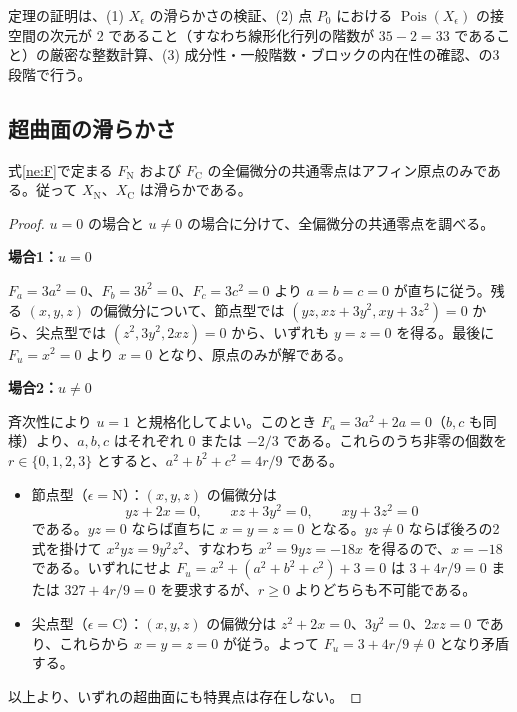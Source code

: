 定理の証明は、(1) $X_\epsilon$ の滑らかさの検証、(2) 点 $P_0$ における $\operatorname{Pois}(X_\epsilon)$ の接空間の次元が $2$ であること（すなわち線形化行列の階数が $35-2=33$ であること）の厳密な整数計算、(3) 成分性・一般階数・ブロックの内在性の確認、の3段階で行う。

\subsection{超曲面の滑らかさ}
\begin{lemma}\label{ne:smooth}
式\eqref{ne:F}で定まる $F_{\mathrm N}$ および $F_{\mathrm C}$ の全偏微分の共通零点はアフィン原点のみである。従って $X_{\mathrm N}$、$X_{\mathrm C}$ は滑らかである。
\end{lemma}
\begin{proof}
$u=0$ の場合と $u\ne0$ の場合に分けて、全偏微分の共通零点を調べる。

\par\medskip\noindent\textbf{場合1：$u=0$}\par\nobreak\smallskip
$F_a=3a^2=0$、$F_b=3b^2=0$、$F_c=3c^2=0$ より $a=b=c=0$ が直ちに従う。残る $(x,y,z)$ の偏微分について、節点型では $(yz,xz+3y^2,xy+3z^2)=0$ から、尖点型では $(z^2,3y^2,2xz)=0$ から、いずれも $y=z=0$ を得る。最後に $F_u=x^2=0$ より $x=0$ となり、原点のみが解である。

\par\medskip\noindent\textbf{場合2：$u\ne0$}\par\nobreak\smallskip
斉次性により $u=1$ と規格化してよい。このとき $F_a=3a^2+2a=0$（$b,c$ も同様）より、$a,b,c$ はそれぞれ $0$ または $-2/3$ である。これらのうち非零の個数を $r\in\{0,1,2,3\}$ とすると、$a^2+b^2+c^2=4r/9$ である。
\begin{itemize}
  \item 節点型（$\epsilon=\mathrm N$）：$(x,y,z)$ の偏微分は
  \begin{equation}
    yz+2x=0,\qquad xz+3y^2=0,\qquad xy+3z^2=0
  \end{equation}
  である。$yz=0$ ならば直ちに $x=y=z=0$ となる。$yz\ne0$ ならば後ろの2式を掛けて $x^2yz=9y^2z^2$、すなわち $x^2=9yz=-18x$ を得るので、$x=-18$ である。いずれにせよ $F_u=x^2+(a^2+b^2+c^2)+3=0$ は $3+4r/9=0$ または $327+4r/9=0$ を要求するが、$r\ge0$ よりどちらも不可能である。
  \item 尖点型（$\epsilon=\mathrm C$）：$(x,y,z)$ の偏微分は $z^2+2x=0$、$3y^2=0$、$2xz=0$ であり、これらから $x=y=z=0$ が従う。よって $F_u=3+4r/9\ne0$ となり矛盾する。
\end{itemize}
以上より、いずれの超曲面にも特異点は存在しない。
\end{proof}

